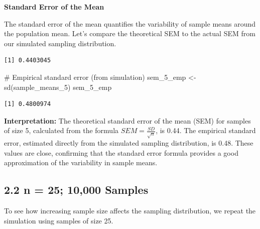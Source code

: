 \documentclass[
  letterpaper,
  DIV=11,
  numbers=noendperiod]{scrreprt}
\newenvironment{Shaded}{\begin{snugshade}}{\end{snugshade}}
\newcommand{\AttributeTok}[1]{\textcolor[rgb]{0.40,0.45,0.13}{#1}}
\newcommand{\CommentTok}[1]{\textcolor[rgb]{0.37,0.37,0.37}{#1}}
\newcommand{\ConstantTok}[1]{\textcolor[rgb]{0.56,0.35,0.01}{#1}}
\newcommand{\FunctionTok}[1]{\textcolor[rgb]{0.28,0.35,0.67}{#1}}
\newcommand{\NormalTok}[1]{\textcolor[rgb]{0.00,0.23,0.31}{#1}}
\newcommand{\OtherTok}[1]{\textcolor[rgb]{0.00,0.23,0.31}{#1}}
\newcommand{\SpecialCharTok}[1]{\textcolor[rgb]{0.37,0.37,0.37}{#1}}
\begin{document}
\textbf{Standard Error of the Mean}

The standard error of the mean quantifies the variability of sample
means around the population mean. Let's compare the theoretical SEM to
the actual SEM from our simulated sampling distribution.

\begin{Shaded}
\end{Shaded}

\begin{verbatim}
[1] 0.4403045
\end{verbatim}

\begin{Shaded}
\begin{Highlighting}[]
\CommentTok{\# Empirical standard error (from simulation) }
\NormalTok{sem\_5\_emp }\OtherTok{\textless{}{-}} \FunctionTok{sd}\NormalTok{(sample\_means\_5) }
\NormalTok{sem\_5\_emp }
\end{Highlighting}
\end{Shaded}

\begin{verbatim}
[1] 0.4800974
\end{verbatim}

\textbf{Interpretation:} The theoretical standard error of the mean
(SEM) for samples of size 5, calculated from the formula
\(SEM = \frac{SD}{\sqrt{n}}\), is 0.44. The empirical standard error,
estimated directly from the simulated sampling distribution, is 0.48.
These values are close, confirming that the standard error formula
provides a good approximation of the variability in sample means.

\subsection*{2.2 n = 25; 10,000 Samples}\label{n-25-10000-samples}

To see how increasing sample size affects the sampling distribution, we
repeat the simulation using samples of size 25.
\end{document}
